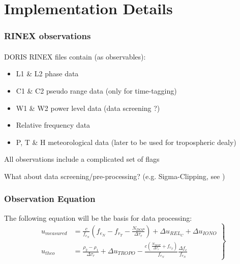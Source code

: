 \documentclass{beamer}
\begin{document}
\section{Implementation Details}

\begin{frame}\frametitle{RINEX observations}\framesubtitle{}
  DORIS RINEX files contain (as observables):
  \begin{itemize}
    \item L1 \& L2 phase data
    \item C1 \& C2 pseudo range data (only for time-tagging)
    \item W1 \& W2 power level data (data screening ?)
    \item Relative frequency data
    \item P, T \& H meteorological data (later to be used for tropospheric dealy)
  \end{itemize}
  \vspace{.2cm}

  All observations include a complicated set of flags\\
  \vspace{.2cm}

  What about data screening/pre-processing? (e.g. Sigma-Clipping, see \citep{Ramanathan})
\end{frame}

\begin{frame}\frametitle{Observation Equation}
  The following equation \cite{lemoine-2016} will be the basis for data processing:
  \begin{equation*}
    \label{eq:lem17}
    \left.\begin{aligned}
        u_{measured} & = \frac{c}{f_{e_N}} 
          (f_{e_N} - f_{r_T}
            - \frac{N_{DOP}}{\Delta\tau_r}) 
          + \Delta u_{{REL}_C} 
          + \Delta u_{IONO}\\
        u_{theo} &= \frac{\rho_2 - \rho_1}{\Delta\tau_r} 
          + \Delta u_{TROPO} 
          - \frac{c(\frac{N_{DOP}}{\Delta\tau_r} 
          + f_{r_T})}{f_{e_N}} 
            \frac{\Delta f_e}{f_{e_N}}
    \end{aligned}
\right\}
\end{equation*}
\end{frame}
\end{document}
